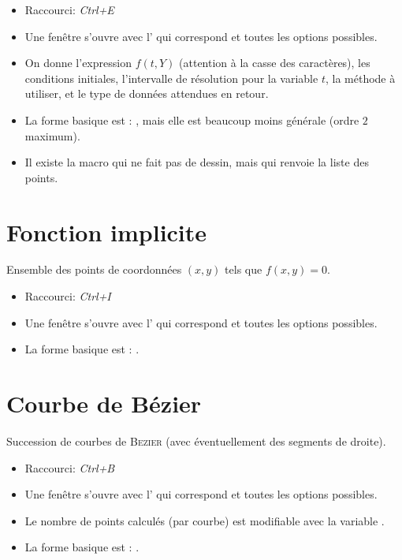 \begin{itemize}
\item Raccourci: \textsl{Ctrl+E}
\item Une fenêtre s'ouvre avec l' qui correspond et toutes les options possibles.
\item On donne l'expression $f(t,Y)$ (attention à la casse des caractères), les conditions initiales, l'intervalle de résolution pour la variable $t$, la méthode à utiliser, et le type de données attendues en retour.
\item La forme basique est : , mais elle est beaucoup moins générale (ordre $2$ maximum).
\item Il existe la macro  qui ne fait pas de dessin, mais qui renvoie la liste des points.
\end{itemize}

\section{Fonction implicite}

Ensemble des points de coordonnées $(x,y)$ tels que $f(x,y)=0$.

\begin{itemize}
\item Raccourci: \textsl{Ctrl+I}
\item Une fenêtre s'ouvre avec l' qui correspond et toutes les options possibles.
\item La forme basique est : .
\end{itemize}

\section{Courbe de Bézier}

Succession de courbes de \textsc{Bezier} (avec éventuellement des segments de droite).

\begin{itemize}
\item Raccourci: \textsl{Ctrl+B}
\item Une fenêtre s'ouvre avec l' qui correspond et toutes les options possibles.
\item Le nombre de points calculés (par courbe) est modifiable avec la variable .
\item La forme basique est : .
\end{itemize}

